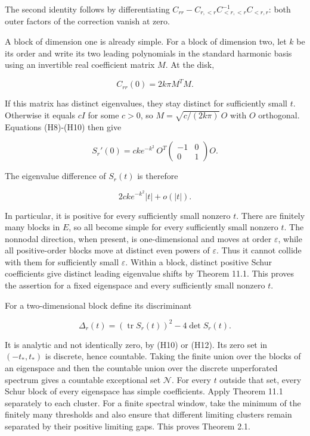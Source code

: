 \documentclass[11pt]{article}
\begin{document}
The second identity follows by differentiating
\(C_{rr}-C_{r,<r}C_{<r,<r}^{-1}C_{<r,r}\): both outer factors of the
correction vanish at zero.

A block of dimension one is already simple. For a block of dimension
two, let \(k\) be its order and write its two leading polynomials in the
standard harmonic basis using an invertible real coefficient matrix
\(M\). At the disk,

\[
 C_{rr}(0)=2k\pi M^TM.
 \tag{H10}
\]

If this matrix has distinct eigenvalues, they stay distinct for
sufficiently small \(t\). Otherwise it equals \(cI\) for some \(c>0\),
so \(M=\sqrt{c/(2k\pi)}\,O\) with \(O\) orthogonal. Equations (H8)-(H10)
then give

\[
 S_r'(0)=c k e^{-k^2}\,
           O^T\begin{pmatrix}-1&0\\0&1\end{pmatrix}O.
 \tag{H11}
\]

The eigenvalue difference of \(S_r(t)\) is therefore

\[
 2c k e^{-k^2}|t|+o(|t|).
 \tag{H12}
\]

In particular, it is positive for every sufficiently small nonzero
\(t\). There are finitely many blocks in \(E\), so all become simple for
every sufficiently small nonzero \(t\). The nonnodal direction, when
present, is one-dimensional and moves at order \(\varepsilon\), while
all positive-order blocks move at distinct even powers of
\(\varepsilon\). Thus it cannot collide with them for sufficiently small
\(\varepsilon\). Within a block, distinct positive Schur coefficients
give distinct leading eigenvalue shifts by Theorem 11.1. This proves the
assertion for a fixed eigenspace and every sufficiently small nonzero
\(t\).

For a two-dimensional block define its discriminant

\[
 \Delta_r(t)=(\operatorname{tr}S_r(t))^2-4\det S_r(t).
 \tag{H13}
\]

It is analytic and not identically zero, by (H10) or (H12). Its zero set
in \((-t_*,t_*)\) is discrete, hence countable. Taking the finite union
over the blocks of an eigenspace and then the countable union over the
discrete unperforated spectrum gives a countable exceptional set
\(\mathcal N\). For every \(t\) outside that set, every Schur block of
every eigenspace has simple coefficients. Apply Theorem 11.1 separately
to each cluster. For a finite spectral window, take the minimum of the
finitely many thresholds and also ensure that different limiting
clusters remain separated by their positive limiting gaps. This proves
Theorem 2.1.
\end{document}
